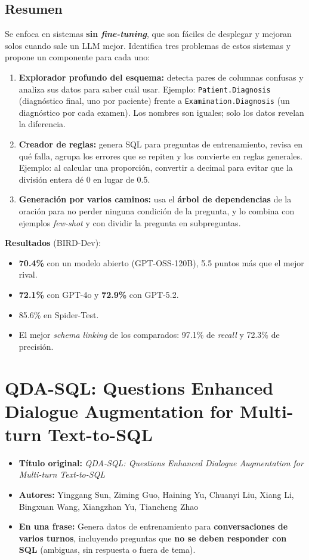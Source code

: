 \documentclass[11pt,a4paper]{article}
\newcommand{\ficha}[5]{%
  \begin{itemize}[leftmargin=*, label={}]
    \item \textbf{Título original:} \textit{#1}
    \item \textbf{Autores:} #2
    \item \textbf{En una frase:} #5
  \end{itemize}
}
\begin{document}
\subsection*{Resumen}
Se enfoca en sistemas \textbf{sin \textit{fine-tuning}}, que son fáciles de desplegar y mejoran solos cuando sale un LLM mejor. Identifica tres problemas de estos sistemas y propone un componente para cada uno:
\begin{enumerate}
  \item \textbf{Explorador profundo del esquema:} detecta pares de columnas confusas y analiza sus datos para saber cuál usar. Ejemplo: \texttt{Patient.Diagnosis} (diagnóstico final, uno por paciente) frente a \texttt{Examination.Diagnosis} (un diagnóstico por cada examen). Los nombres son iguales; solo los datos revelan la diferencia.
  \item \textbf{Creador de reglas:} genera SQL para preguntas de entrenamiento, revisa en qué falla, agrupa los errores que se repiten y los convierte en reglas generales. Ejemplo: al calcular una proporción, convertir a decimal para evitar que la división entera dé 0 en lugar de 0.5.
  \item \textbf{Generación por varios caminos:} usa el \textbf{árbol de dependencias} de la oración para no perder ninguna condición de la pregunta, y lo combina con ejemplos \textit{few-shot} y con dividir la pregunta en subpreguntas.
\end{enumerate}

\textbf{Resultados} (BIRD-Dev):
\begin{itemize}
  \item \textbf{70.4\%} con un modelo abierto (GPT-OSS-120B), 5.5 puntos más que el mejor rival.
  \item \textbf{72.1\%} con GPT-4o y \textbf{72.9\%} con GPT-5.2.
  \item 85.6\% en Spider-Test.
  \item El mejor \textit{schema linking} de los comparados: 97.1\% de \textit{recall} y 72.3\% de precisión.
\end{itemize}

\section{QDA-SQL: Questions Enhanced Dialogue Augmentation for Multi-turn Text-to-SQL}
\ficha
  {QDA-SQL: Questions Enhanced Dialogue Augmentation for Multi-turn Text-to-SQL}
  {Yinggang Sun, Ziming Guo, Haining Yu, Chuanyi Liu, Xiang Li, Bingxuan Wang, Xiangzhan Yu, Tiancheng Zhao}
  {Harbin Institute of Technology y Harbin University of Science and Technology}
  {arXiv:2406.10593v3, julio 2026}
  {Genera datos de entrenamiento para \textbf{conversaciones de varios turnos}, incluyendo preguntas que \textbf{no se deben responder con SQL} (ambiguas, sin respuesta o fuera de tema).}
\end{document}
